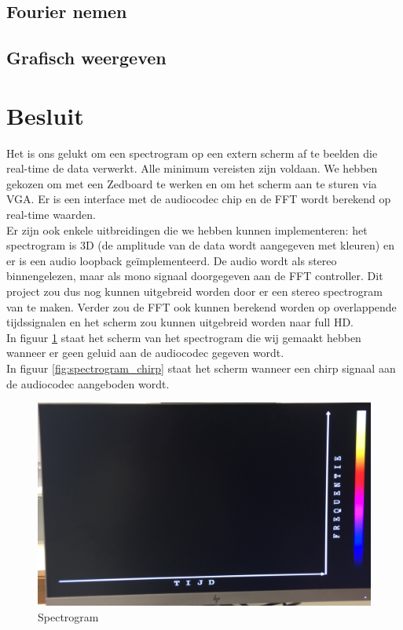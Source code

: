 \documentclass[a4paper,kul]{kulakarticle} %
\begin{document}
\subsection{Fourier nemen}

\subsection{Grafisch weergeven}

\section{Besluit}

Het is ons gelukt om een spectrogram op een extern scherm af te beelden die real-time de data verwerkt. Alle minimum vereisten zijn voldaan. We hebben gekozen om met een Zedboard te werken en om het scherm aan te sturen via VGA. Er is een interface met de audiocodec chip en de FFT wordt berekend op real-time waarden.\\

Er zijn ook enkele uitbreidingen die we hebben kunnen implementeren: het spectrogram is 3D (de amplitude van de data wordt aangegeven met kleuren) en er is een audio loopback geïmplementeerd. De audio wordt als stereo binnengelezen, maar als mono signaal doorgegeven aan de FFT controller. Dit project zou dus nog kunnen uitgebreid worden door er een stereo spectrogram van te maken. Verder zou de FFT ook kunnen berekend worden op overlappende tijdssignalen en het scherm zou kunnen uitgebreid worden naar full HD.\\

In figuur \ref{fig:spectrogram_leeg} staat het scherm van het spectrogram die wij gemaakt hebben wanneer er geen geluid aan de audiocodec gegeven wordt. \\
In figuur \ref{fig:spectrogram_chirp} staat het scherm wanneer een chirp signaal aan de audiocodec aangeboden wordt.

\begin{figure}[H]
	\centering
	\includegraphics[width=0.7\linewidth]{Spectrogram_leeg.jpg}
	\caption{Spectrogram}
	\label{fig:spectrogram_leeg}
\end{figure}
\end{document}
